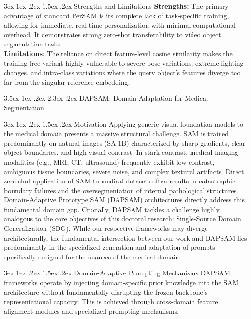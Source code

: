 \documentclass[journal,12pt,onecolumn,draftclsnofoot]{IEEEtran}
\makeatletter
\renewcommand{\section}{\@startsection{section}{1}{\z@}%
    {3.5ex \@plus 1ex \@minus .2ex}%
    {2.3ex \@plus.2ex}%
    {\normalfont\Large\bfseries}}
\renewcommand{\subsection}{\@startsection{subsection}{2}{\z@}%
    {3ex \@plus 1ex \@minus .2ex}%
    {1.5ex \@plus.2ex}%
    {\normalfont\large\bfseries}}
\makeatother
\begin{document}
\subsection{Strengths and Limitations}
\textbf{Strengths:} The primary advantage of standard PerSAM is its complete lack of task-specific training, allowing for immediate, real-time personalization with minimal computational overhead. It demonstrates strong zero-shot transferability to video object segmentation tasks.\\
\textbf{Limitations:} The reliance on direct feature-level cosine similarity makes the training-free variant highly vulnerable to severe pose variations, extreme lighting changes, and intra-class variations where the query object's features diverge too far from the singular reference embedding.


\newpage


\section{DAPSAM: Domain Adaptation for Medical Segmentation \cite{wei2024prompting}}

\subsection{Motivation}
Applying generic visual foundation models to the medical domain presents a massive structural challenge. SAM is trained predominantly on natural images (SA-1B) characterized by sharp gradients, clear object boundaries, and high visual contrast. In stark contrast, medical imaging modalities (e.g., MRI, CT, ultrasound) frequently exhibit low contrast, ambiguous tissue boundaries, severe noise, and complex textural artifacts. Direct zero-shot application of SAM to medical datasets often results in catastrophic boundary failures and the oversegmentation of internal pathological structures. Domain-Adaptive Prototype SAM (DAPSAM) architectures \cite{wei2024prompting} directly address this fundamental domain gap. Crucially, DAPSAM tackles a challenge highly analogous to the core objectives of this doctoral research: Single-Source Domain Generalization (SDG). While our respective frameworks may diverge architecturally, the fundamental intersection between our work and DAPSAM lies predominantly in the specialized generation and adaptation of prompts specifically designed for the nuances of the medical domain.

\subsection{Domain-Adaptive Prompting Mechanisms}
DAPSAM frameworks operate by injecting domain-specific prior knowledge into the SAM architecture without fundamentally disrupting the frozen backbone's representational capacity. This is achieved through cross-domain feature alignment modules and specialized prompting mechanisms. 
\end{document}

